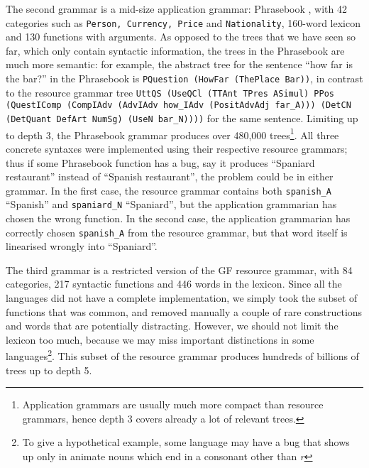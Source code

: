 \documentclass[11pt]{article}
\def\t#1{\texttt{#1}}
\begin{document}
The second grammar is a mid-size application grammar: Phrasebook
\cite{ranta2010phrasebook}, with 42 categories such as \t{Person,
  Currency, Price} and \t{Nationality}, 160-word lexicon and 130
functions with arguments. As opposed to the trees that we have seen so far,
which only contain syntactic information, the trees in the Phrasebook
are much more semantic: for example, the abstract tree for the
sentence ``how far is the bar?'' in the Phrasebook is \t{PQuestion
  (HowFar (ThePlace Bar))}, in contrast to the resource grammar tree
{\tt \small UttQS (UseQCl (TTAnt TPres ASimul) PPos (QuestIComp
  (CompIAdv (AdvIAdv how\_IAdv (PositAdvAdj far\_A))) 
  (DetCN (DetQuant DefArt NumSg) (UseN bar\_N))))} for the same
sentence. Limiting up to depth 3, the Phrasebook grammar produces over
480,000 trees\footnote{Application grammars are usually
much more compact than resource grammars, hence depth 3 covers already
a lot of relevant trees.}. All three concrete syntaxes were
implemented using their respective resource grammars; thus if some
Phrasebook function has a bug, say it produces ``Spaniard restaurant''
instead of ``Spanish restaurant'', the problem could be in either grammar.
In the first case, the resource grammar contains both \t{spanish\_A} ``Spanish'' and
\t{spaniard\_N} ``Spaniard'', but the application grammarian has
chosen the wrong function.
In the second case, the application grammarian has correctly chosen
\t{spanish\_A} from the resource grammar, but that word itself is
linearised wrongly into ``Spaniard''.



The third grammar is a restricted version of the GF resource grammar,
with 84 categories, 217 syntactic functions and 446 words in the
lexicon. Since all the languages did not have a complete
implementation, we simply took the subset of functions that was
common, and removed manually a couple of rare constructions and words
that are potentially distracting. However, we should not limit the
lexicon too much, because we may miss important distinctions 
in some languages\footnote{To give a hypothetical example, some language may
have a bug that shows up only in animate nouns which end in a
consonant other than \emph{r}}. This subset of the resource grammar
produces hundreds of billions of trees up to depth 5.
\end{document}
